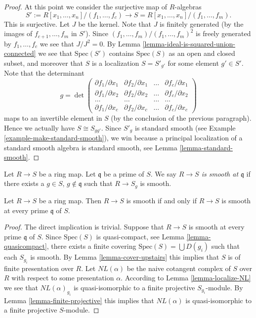 \begin{proof}
\medskip\noindent
At this point we consider the surjective map of $R$-algebras
$$
S' := R[x_1, \ldots, x_n]/(f_1, \ldots, f_c)
\longrightarrow
S = R[x_1, \ldots, x_n]/(f_1, \ldots, f_m).
$$
This is surjective. Let $J$ be the kernel. Note that
$J$ is finitely generated (by the images of $f_{c + 1}, \ldots, f_m$
in $S'$). Since $(f_1, \ldots, f_m)/(f_1, \ldots, f_m)^2$ is freely
generated by $f_1, \ldots, f_c$ we see that $J/J^2 = 0$.
By Lemma \ref{lemma-ideal-is-squared-union-connected}
we see that $\text{Spec}(S')$ contains $\text{Spec}(S)$
as an open and closed subset, and moreover that $S$ is a localization
$S = S'_{g'}$ for some element $g' \in S'$. Note that the determinant
$$
g =
\det
\left(
\begin{matrix}
\partial f_1/\partial x_1 &
\partial f_2/\partial x_1 &
\ldots &
\partial f_c/\partial x_1 \\
\partial f_1/\partial x_2 &
\partial f_2/\partial x_2 &
\ldots &
\partial f_c/\partial x_2 \\
\ldots & \ldots & \ldots & \ldots \\
\partial f_1/\partial x_c &
\partial f_2/\partial x_c &
\ldots &
\partial f_c/\partial x_c
\end{matrix}
\right)
$$
maps to an invertible element in $S$ (by the conclusion of the
previous paragraph). Hence
we actually have $S \cong S_{gg'}$. Since
$S'_g$ is standard smooth (see Example \ref{example-make-standard-smooth}),
we win because a principal localization of a standard smooth
algebra is standard smooth, see Lemma \ref{lemma-standard-smooth}.
\end{proof}

\begin{definition}
\label{definition-smooth-at-prime}
Let $R \to S$ be a ring map.
Let $\mathfrak q$ be a prime of $S$.
We say {\it $R \to S$ is smooth at $\mathfrak q$} if there
exists a $g \in S$, $g \not \in \mathfrak q$ such
that $R \to S_g$ is smooth.
\end{definition}

\begin{lemma}
\label{lemma-locally-smooth}
Let $R \to S$ be a ring map.
Then $R \to S$ is smooth if and only if $R \to S$ is smooth
at every prime $\mathfrak q$ of $S$.
\end{lemma}

\begin{proof}
The direct implication is trivial. Suppose that $R \to S$ is smooth
at every prime $\mathfrak q$ of $S$. Since $\text{Spec}(S)$ is
quasi-compact, see Lemma \ref{lemma-quasicompact},
there exists a finite covering
$\text{Spec}(S) = \bigcup D(g_i)$ such that each $S_{g_i}$ is
smooth. By Lemma \ref{lemma-cover-upstairs} this implies that
$S$ is of finite presentation over $R$. Let $NL(\alpha)$ be
the naive cotangent complex of $S$ over $R$ with respect to some
presentation $\alpha$. According to Lemma \ref{lemma-localize-NL}
we see that
$NL(\alpha)_{g_i}$ is quasi-isomorphic to a finite projective
$S_{g_i}$-module. By Lemma \ref{lemma-finite-projective}
this implies that $NL(\alpha)$ is quasi-isomorphic to a finite
projective $S$-module.
\end{proof}

